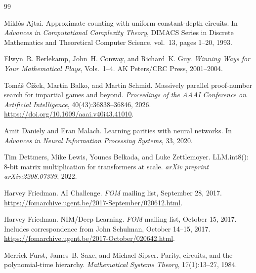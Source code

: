\documentclass[twoside,11pt]{article}
\numberwithin{theorem}{section}
\numberwithin{equation}{section}
\begin{document}
\begin{thebibliography}{99}

Mikl{\'o}s Ajtai.
\newblock Approximate counting with uniform constant-depth circuits.
\newblock In \emph{Advances in Computational Complexity Theory}, DIMACS Series in Discrete Mathematics and Theoretical Computer Science, vol.~13, pages 1--20, 1993.

Elwyn~R. Berlekamp, John~H. Conway, and Richard~K. Guy.
\newblock \emph{Winning Ways for Your Mathematical Plays}, Vols.~1--4.
\newblock AK Peters/CRC Press, 2001--2004.

Tom{\'a}\v{s} \v{C}{\'i}\v{z}ek, Martin Balko, and Martin Schmid.
\newblock Massively parallel proof-number search for impartial games and beyond.
\newblock \emph{Proceedings of the AAAI Conference on Artificial Intelligence}, 40(43):36838--36846, 2026.
\newblock \url{https://doi.org/10.1609/aaai.v40i43.41010}.

Amit Daniely and Eran Malach.
\newblock Learning parities with neural networks.
\newblock In \emph{Advances in Neural Information Processing Systems}, 33, 2020.

Tim Dettmers, Mike Lewis, Younes Belkada, and Luke Zettlemoyer.
\newblock LLM.int8(): 8-bit matrix multiplication for transformers at scale.
\newblock \emph{arXiv preprint arXiv:2208.07339}, 2022.

Harvey Friedman.
\newblock AI Challenge.
\newblock \emph{FOM} mailing list, September 28, 2017.
\newblock \url{https://fomarchive.ugent.be/2017-September/020612.html}.

Harvey Friedman.
\newblock NIM/Deep Learning.
\newblock \emph{FOM} mailing list, October 15, 2017.
\newblock Includes correspondence from John Schulman, October 14--15, 2017.
\newblock \url{https://fomarchive.ugent.be/2017-October/020642.html}.

Merrick Furst, James~B. Saxe, and Michael Sipser.
\newblock Parity, circuits, and the polynomial-time hierarchy.
\newblock \emph{Mathematical Systems Theory}, 17(1):13--27, 1984.


\end{thebibliography}
\end{document}
